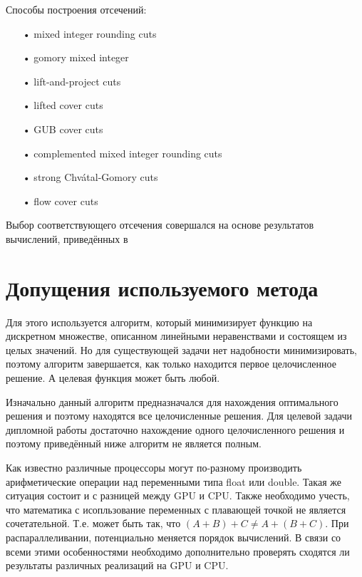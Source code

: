 \documentclass[a4paper,14pt,russian]{extreport}
\begin{document}
\par Способы построения отсечений:
  \begin{itemize}
  \item[•] mixed integer rounding cuts \cite{nemhauser_wolsey}
  \item[•] gomory mixed integer \cite{gomory}
  \item[•] lift-and-project cuts \cite{balas_ceria_corn} \cite{balas_ceria_corn_1}
  \item[•] lifted cover cuts \cite{balas}\cite{balas_zemel}\cite{martin_weismantel}
  \item[•] GUB cover cuts \cite{wolsey}
  \item[•] complemented mixed integer rounding cuts \cite{marchand_wolsey}
  \item[•] strong Chvátal-Gomory cuts \cite{chvatal} \cite{letchford_lodi}
  \item[•] flow cover cuts \cite{padberg} \cite{van_roy}
  \end{itemize}
\par Выбор соответствующего отсечения совершался на основе результатов вычислений, приведённых в \cite{achterberg}


\section{Допущения используемого метода}

Для этого используется алгоритм, который минимизирует функцию на дискретном множестве, описанном линейными неравенствами и состоящем из целых значений. Но для существующей задачи нет надобности минимизировать, поэтому алгоритм завершается, как только находится первое целочисленное решение. А целевая функция может быть любой. 
\par Изначально данный алгоритм предназначался для нахождения оптимального решения и поэтому находятся все целочисленные решения. Для целевой задачи дипломной работы достаточно нахождение одного целочисленного решения и поэтому приведённый ниже алгоритм не является полным. 
\par Как известно различные процессоры могут по-разному производить арифметические операции над переменными типа float или double. Такая же ситуация состоит и с разницей между GPU и CPU. Также необходимо учесть, что математика с исопльзование переменных с плавающей точкой не является сочетательной. Т.е. может быть так, что $(A+B)+C\neq A+(B+C)$. При распараллеливании, потенциально меняется порядок вычислений. В связи со всеми этими особенностями необходимо дополнительно проверять сходятся ли результаты различных реализаций на GPU и CPU. 
\end{document}
